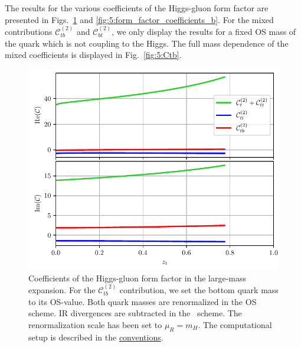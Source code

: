 The results for the various coefficients of the Higgs-gluon form factor are presented in Figs.~\ref{fig:5:form_factor_coefficients_t} and \ref{fig:5:form_factor_coefficients_b}. For the mixed contributions $\mathcal{C}^{(2)}_{tb}$ and $\mathcal{C}^{(2)}_{bt}$, we only display the results for a fixed \acs{OS} mass of the quark which is not coupling to the Higgs. The full mass dependence of the mixed coefficients is displayed in Fig.~\ref{fig:5:Ctb}.
\begin{figure}[h]
\centering
\includegraphics[width=\figurewidth]{Images/form_factor_coefficients_t.pdf}
\caption{Coefficients of the Higgs-gluon form factor in the large-mass expansion. For the $\mathcal{C}_{tb}^{(2)}$ contribution, we set the bottom quark mass to its \acs{OS}-value. Both quark masses are renormalized in the \acs{OS} scheme. \acs{IR} divergences are subtracted in the \MS\ scheme. The renormalization scale has been set to $\mu_R = m_H$. The computational setup is described in the \hyperref[chap:notation_and_conventions]{conventions}.}
\label{fig:5:form_factor_coefficients_t}
\end{figure}
